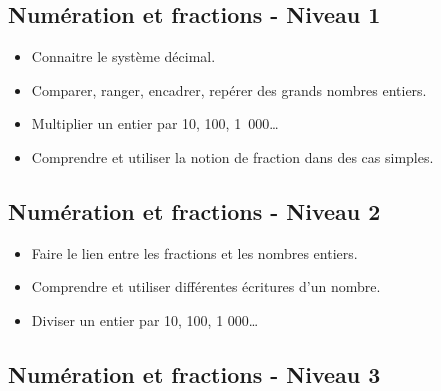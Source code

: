\documentclass[a4paper,12pt,fleqn]{article}
\begin{document}
\renewcommand{\labelitemi}{}

\subsection*{Numération et fractions - Niveau 1}

\begin{itemize}
	\item {}Connaitre le système décimal.
	\item {}Comparer, ranger, encadrer, repérer des grands nombres entiers.
	\item {}Multiplier un entier par 10, 100, 1~000\ldots
	\item {}Comprendre et utiliser la notion de fraction dans des cas simples.

\end{itemize}

\subsection*{Numération et fractions - Niveau 2}

\begin{itemize}
	\item {}Faire le lien entre les fractions et les nombres entiers.
	\item {}Comprendre et utiliser différentes écritures d’un nombre.
	\item {}Diviser un entier par 10, 100, 1 000…
\end{itemize}

\subsection*{Numération et fractions - Niveau 3}
\end{document}
